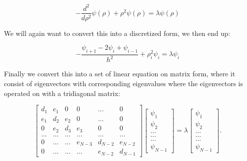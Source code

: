 \documentclass[twoside,onecolumn]{article}
\begin{document}
\begin{equation*}
  -\frac{d^2}{d\rho^2} \psi(\rho) + \rho^2\psi(\rho)  = \lambda \psi(\rho)
\end{equation*}


\bigskip

We will again want to convert this into a discretized form, we then end up:

\begin{equation*}
-\frac{\psi_{i+1} -2\psi_{i} +\psi_{i-1} }{h^2}+\rho_i^2\psi_i  = \lambda\psi_i
\end{equation*}

\bigskip

Finally we convert this into a set of linear equation on matrix form,  where it consist of eigenvectors with corresponding eigenvalues where the eigenvectors is operated on with a tridiagonal matrix:

\bigskip

\begin{equation*}
    \begin{bmatrix}d_1 & e_1 & 0   & 0    & \dots  &0   \\
                                e_1 & d_2 & e_2 & 0    & \dots  &0  \\
                                0   & e_2 & d_3 & e_3  &0       &0\\
                                \dots  & \dots & \dots & \dots  &\dots      &\dots\\
                                0   & \dots & \dots & e_{N-3} & d_{N-2} & e_{N-2}\\
                                0   & \dots & \dots & \dots  &e_{N-2} & d_{N-1}
             \end{bmatrix}  \begin{bmatrix} \psi_{1} \\
                                                              \psi_{2} \\
                                                              \dots\\ \dots\\ \dots\\
                                                              \psi_{N-1}
             \end{bmatrix}=\lambda \begin{bmatrix} \psi_{1} \\
                                                              \psi_{2} \\
                                                              \dots\\ \dots\\ \dots\\
                                                              \psi_{N-1}
             \end{bmatrix}.  
\end{equation*}
\end{document}
